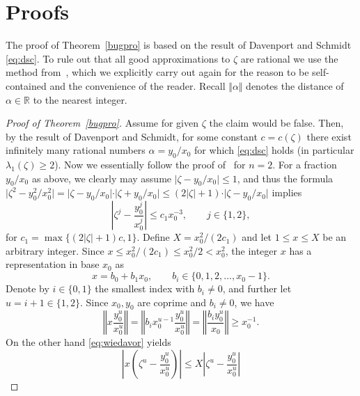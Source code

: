 \documentclass[12pt]{amsart}
\theoremstyle{definition}
\begin{document}
\section{Proofs} \label{proofs}

The proof of Theorem~\ref{bugpro} is based on the result of Davenport and Schmidt \eqref{eq:dsc}. To rule out that all good approximations
to $\zeta$ are rational we use the method
from~\cite[Theorem~1.12]{j3}, which we explicitly carry out again
for the reason to be self-contained and the convenience of the reader. Recall $\Vert \alpha\Vert$ denotes the distance of 
$\alpha\in\mathbb{R}$ to the nearest integer. 

\begin{proof}[Proof of Theorem~\ref{bugpro}]
Assume for given $\zeta$ the claim would be false. Then, 
by the result of Davenport and Schmidt, for some 
constant $c=c(\zeta)$
there exist infinitely many rational numbers $\alpha=y_{0}/x_{0}$ for which \eqref{eq:dsc} holds (in particular 
$\lambda_{1}(\zeta)\geq 2$). Now we essentially follow 
the proof of~\cite[Theorem~1.12]{j3} for $n=2$.
For a fraction $y_{0}/x_{0}$ as above, we clearly may assume
$\vert\zeta-y_{0}/x_{0}\vert\leq 1$, and thus
the formula $\vert \zeta^{2}-y_{0}^{2}/x_{0}^{2}\vert=\vert\zeta-y_{0}/x_{0}\vert \cdot \vert\zeta+y_{0}/x_{0}\vert\leq
(2\vert \zeta\vert+1)\cdot \vert\zeta-y_{0}/x_{0}\vert$ implies
%
\begin{equation} \label{eq:wiedavor}
\left\vert \zeta^{j}-\frac{y_{0}^{j}}{x_{0}^{j}}\right\vert 
\leq c_{1} x_{0}^{-3}, \qquad j\in{\{1,2\}},
\end{equation}
%
for $c_{1}=\max\{ (2\vert \zeta\vert+1)c,1\}$.
Define $X=x_{0}^{2}/(2c_{1})$ and let
$1\leq x\leq X$ be an arbitrary integer. 
Since $x\leq x_{0}^{2}/(2c_{1})\leq x_{0}^{2}/2<x_{0}^{2}$,
the integer $x$ has a representation in base $x_{0}$ as
%
\[
x= b_{0}+b_{1}x_{0}, \qquad b_{i}\in\{0,1,2,\ldots,x_{0}-1\}.
\]
%  
Denote by $i\in\{0,1\}$ the smallest index with $b_{i}\neq 0$, and
further let $u=i+1\in\{1,2\}$.
Since $x_{0},y_{0}$ are coprime and $b_{i}\neq 0$, we have
%
\begin{equation} \label{eq:zzz}
\left\Vert x\frac{y_{0}^{u}}{x_{0}^{u}}\right\Vert = 
\left\Vert b_{i}x_{0}^{u-1}\frac{y_{0}^{u}}{x_{0}^{u}}\right\Vert= \left\Vert \frac{b_{i}y_{0}^{u}}{x_{0}}\right\Vert\geq x_{0}^{-1}.
\end{equation}
%
On the other hand \eqref{eq:wiedavor} yields
%
\begin{equation} \label{eq:zz}
\left\vert x\left(\zeta^{u}-\frac{y_{0}^{u}}{x_{0}^{u}} \right)\right\vert\leq X\left\vert\zeta^{u}-\frac{y_{0}^{u}}{x_{0}^{u}} \right\vert

\end{equation}
\end{proof}
\end{document}
